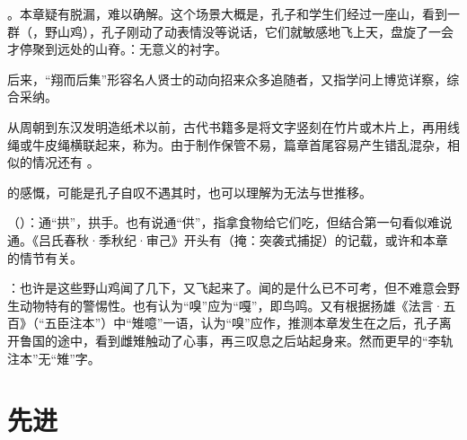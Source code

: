 {
\item {}。本章疑有脱漏，难以确解。这个场景大概是，孔子和学生们经过一座山，看到一群（，野山鸡），孔子刚动了动表情没等说话，它们就敏感地飞上天，盘旋了一会才停聚到远处的山脊。：无意义的衬字。


后来，“翔而后集”形容名人贤士的动向招来众多追随者，又指学问上博览详察，综合采纳。

从周朝到东汉发明造纸术以前，古代书籍多是将文字竖刻在竹片或木片上，再用线绳或牛皮绳横联起来，称为。由于制作保管不易，篇章首尾容易产生错乱混杂，相似的情况还有   。

\item {}的感慨，可能是孔子自叹不遇其时，也可以理解为无法与世推移。
\item {}（）：通“拱”，拱手。也有说通“供”，指拿食物给它们吃，但结合第一句看似难说通。《吕氏春秋·季秋纪·审己》开头有（掩：突袭式捕捉）的记载，或许和本章的情节有关。
\item {}：也许是这些野山鸡闻了几下，又飞起来了。闻的是什么已不可考，但不难意会野生动物特有的警惕性。也有认为“嗅”应为“嘎”，即鸟鸣。又有根据扬雄《法言·五百》（“五臣注本”）中“雉噫”一语，认为“嗅”应作，推测本章发生在之后，孔子离开鲁国的途中，看到雌雉触动了心事，再三叹息之后站起身来。然而更早的“李轨注本”无“雉”字。
}
{}



\chapter{先进}

